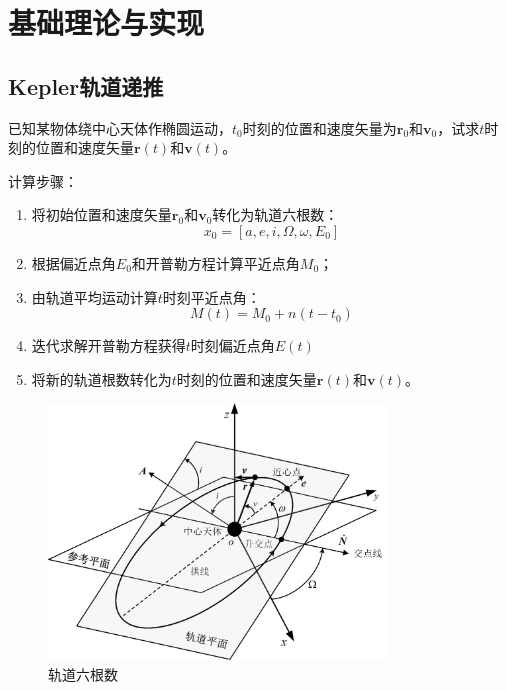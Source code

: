 \documentclass[12pt,a4paper]{article}
\begin{document}
\section{基础理论与实现}
\subsection{Kepler轨道递推}

已知某物体绕中心天体作椭圆运动，$t_0$时刻的位置和速度矢量为$\mathbf{r}_0$和$\mathbf{v}_0$，试求$t$时刻的位置和速度矢量$\mathbf{r}(t)$和$\mathbf{v}(t)$。

计算步骤：
\begin{enumerate}
    \item 将初始位置和速度矢量$\mathbf{r}_0$和$\mathbf{v}_0$转化为轨道六根数：
    $$
    x_0 = \left[a, e, i, \Omega, \omega, E_0\right]
    $$
    
    \item 根据偏近点角$E_0$和开普勒方程计算平近点角$M_0$；
    
    \item 由轨道平均运动计算$t$时刻平近点角：
    $$
    M(t) = M_0 + n(t - t_0)
    $$
    
    \item 迭代求解开普勒方程获得$t$时刻偏近点角$E(t)$    \item 将新的轨道根数转化为$t$时刻的位置和速度矢量$\mathbf{r}(t)$和$\mathbf{v}(t)$。
\end{enumerate}

\begin{figure}[H]
    \centering
    \includegraphics[width=0.8\textwidth]{images/coe.png}
    \caption{轨道六根数}
\end{figure}


\end{document}
